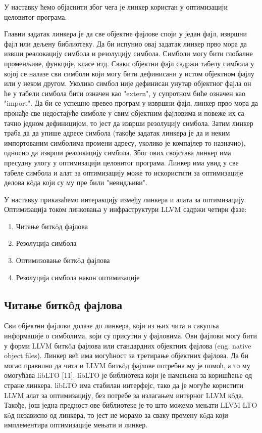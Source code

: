 \documentclass[12pt,oneside]{memoir}
\begin{document}
У наставку ћемо објаснити због чега је линкер користан у оптимизацији целовитог програма.

Главни задатак линкера је да све објектне фајлове споји у један фајл, извршни фајл
или дељену библиотеку. 
Да би испунио овај задатак линкер прво мора да извши реалокацију симбола и резолуцију
симбола.
Симболи могу бити глобалне променљиве, функције, класе итд. 
Сваки објектни фајл садржи табелу симбола у којој се налазе сви симболи који 
могу бити дефинисани у истом објектном фајлу или у неком другом.
Уколико симбол није дефинисан унутар објектног фајла он ће у табели симбола бити
означен као "extern", у супротном биће означен као "import".
Да би се успешно превео програм у извршни фајл, линкер прво мора да пронађе све 
недостајуће симболе у свим објектним фајловима и повеже их са тачно једном дефиницијом, то јест да изврши резолуцију симбола.
Затим линкер траба да да упише адресе симбола (такође задатак
линкера је да и неким импортованим симболима промени адресу, уколико је компајлер то назначио), односно да изврши реалокацију симбола.
Због ових својстава линкер има пресудну улогу у оптимизацији целовитог програма.
Линкер 
има увид у све табеле симбола и алат за оптимизацију може то искористити за оптимизације
делова к\^{o}да који су му пре били "невидљиви". 

У наставку приказаћемо интеракцију између линкера и алата за оптимизацију.
Оптимизација током линковања у инфраструктури LLVM садржи четири фазе:
\begin{enumerate}
\item Читање битк\^{o}д фајлова
\item Резолуција симбола
\item Оптимизовање битк\^{o}д фајлова
\item Резолуција симбола након оптимизације
\end{enumerate}

\subsection{Читање битк\^{o}д фајлова}
Сви објектни фајлови долазе до линкера, који из њих чита и сакупља информације
о симболима, који су присутни у фајловима.
Ови фајлови могу бити у форми LLVM битк\^{o}д фајлова или стандардних објектних
фајлова (eng. native object files).
Линкер већ има могућност за третирање објектних фајлова.
Да би могао
правилно да чита и LLVM битк\^{o}д фајлове потребна му је помоћ, а то му омогућава
 libLTO [11].
libLTO је библиотека који је намењена за коришћење од стране линкера.
libLTO има стабилан интерфејс, тако да је могуће користити
LLVM алат за оптимизацију, без потребе за излагањем интерног LLVM к\^{o}да.
Такође, још једна предност ове библиотеке је то што можемо мењати LLVM LTO к\^{o}д независно
од линкера, то јест не морамо за сваку промену к\^{o}да који имплементира
оптимизације мењати и линкер.
\end{document}
